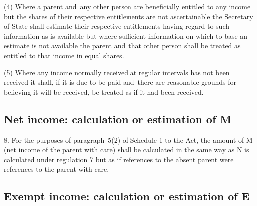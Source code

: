 \documentclass[12pt,a4paper]{article}
\begin{document}
(4) Where a parent and~any other person are beneficially entitled to any income but the shares of their respective entitlements are not ascertainable the 
Secretary of State  %
shall estimate their respective entitlements having regard to such information as is available but where sufficient information on which to base an estimate is not available the parent and~that other person shall be treated as entitled to that income in equal shares.

(5) Where any income normally received at regular intervals has not been received it shall, if it is due to be paid and~there are reasonable grounds for believing it will be received, be treated as if it had been received.


\subsection[8. Net income: calculation or estimation of M]{Net income: calculation or estimation of M}

8.  For the purposes of paragraph~5(2) of Schedule 1 to the Act, the amount of M (net income of the parent with care) shall be calculated in the same way as N is calculated under regulation 7 but as if references to the absent parent were references to the parent with care.

\subsection[9. Exempt income: calculation or estimation of E]{Exempt income: calculation or estimation of E}
\end{document}

